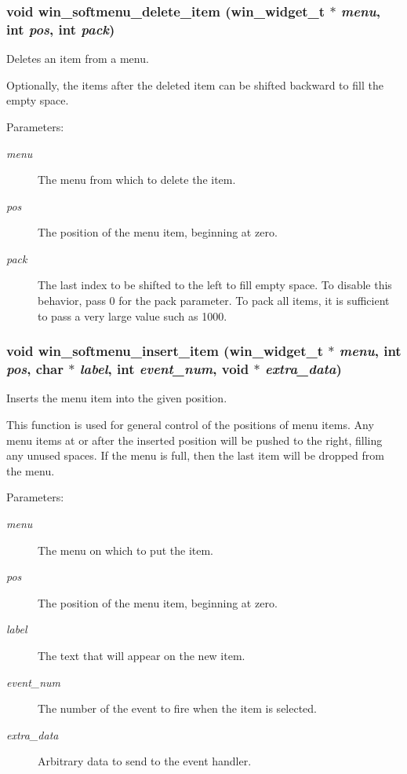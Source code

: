 \subsubsection{\setlength{\rightskip}{0pt plus 5cm}void win\_\-softmenu\_\-delete\_\-item ({\bf win\_\-widget\_\-t} $\ast$ {\em menu}, int {\em pos}, int {\em pack})}\label{winsoftmenu_8h_a5}


Deletes an item from a menu. 

Optionally, the items after the deleted item can be shifted backward to fill the empty space.

\begin{Desc}
\item[Parameters:]
\begin{description}
\item[{\em menu}]The menu from which to delete the item. \item[{\em pos}]The position of the menu item, beginning at zero. \item[{\em pack}]The last index to be shifted to the left to fill empty space. To disable this behavior, pass 0 for the pack parameter. To pack all items, it is sufficient to pass a very large value such as 1000. \end{description}
\end{Desc}
\subsubsection{\setlength{\rightskip}{0pt plus 5cm}void win\_\-softmenu\_\-insert\_\-item ({\bf win\_\-widget\_\-t} $\ast$ {\em menu}, int {\em pos}, char $\ast$ {\em label}, int {\em event\_\-num}, void $\ast$ {\em extra\_\-data})}\label{winsoftmenu_8h_a4}


Inserts the menu item into the given position. 

This function is used for general control of the positions of menu items. Any menu items at or after the inserted position will be pushed to the right, filling any unused spaces. If the menu is full, then the last item will be dropped from the menu.

\begin{Desc}
\item[Parameters:]
\begin{description}
\item[{\em menu}]The menu on which to put the item. \item[{\em pos}]The position of the menu item, beginning at zero. \item[{\em label}]The text that will appear on the new item. \item[{\em event\_\-num}]The number of the event to fire when the item is selected. \item[{\em extra\_\-data}]Arbitrary data to send to the event handler. \end{description}
\end{Desc}
